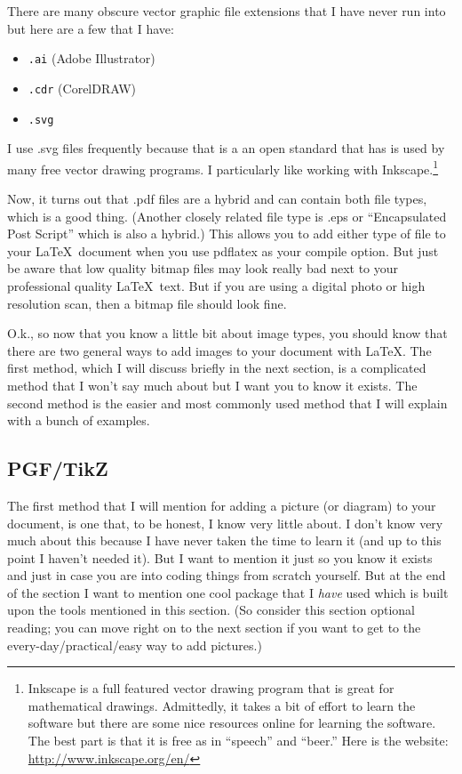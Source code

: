 \documentclass{article}
\begin{document}
There are many obscure vector graphic file extensions that I have never run into but here are a few that I have:
\begin{itemize}
\renewcommand{\labelitemi}{$\triangleright$}
\item \texttt{.ai} (Adobe Illustrator)
\item \texttt{.cdr} (CorelDRAW)
\item \texttt{.svg} 
\end{itemize} 
I use .svg files frequently because that is a an open standard that has is used by many free vector drawing programs.  I particularly like working with Inkscape.\footnote{Inkscape is a full featured vector drawing program that is great for mathematical drawings.  Admittedly, it takes a bit of effort to learn the software but there are some nice resources online for learning the software. The best part is that it is free as in ``speech'' and ``beer.'' Here is the website: \url{http://www.inkscape.org/en/}} 

Now, it turns out that .pdf files are a hybrid and can contain both file types, which is a good thing. (Another closely related file type is .eps or ``Encapsulated Post Script'' which is also a hybrid.)  This allows you to add either type of file to your \LaTeX\ document when you use pdflatex as your compile option.  But just be aware that low quality bitmap files may look really bad next to your professional quality \LaTeX\ text.  But if you are using a digital photo or high resolution scan, then a bitmap file should look fine.

O.k., so now that you know a little bit about image types, you should know that there are two general ways to add images to your document with \LaTeX.  The first method, which I will discuss briefly in the next section, is a complicated method that I won't say much about but I want you to know it exists.  The second method is the easier and most commonly used method that I will explain with a bunch of examples. 

\subsection{PGF/TikZ}
The first method that I will mention for adding a picture (or diagram) to your document, is one that, to be honest, I know very little about.  I don't know very much about this because I have never taken the time to learn it (and up to this point I haven't needed it).  But I want to mention it just so you know it exists and just in case you are into coding things from scratch yourself.  But at the end of the section I want to mention one cool package that I \emph{have} used which is built upon the tools mentioned in this section.  (So consider this section optional reading; you can move right on to the next section if you want to get to the every-day/practical/easy way to add pictures.) 
\end{document}
